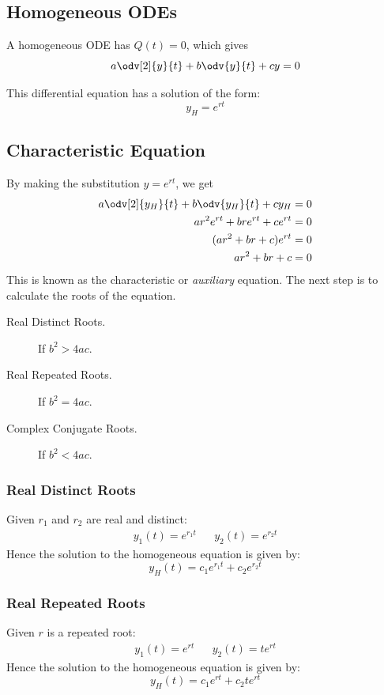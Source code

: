 \documentclass{article}
\begin{document}
\subsection{Homogeneous ODEs}
\begin{definition}
    A homogeneous ODE has \(Q(t)=0\), which gives
    \begin{equation*}
        a \odv[2]{y}{t} + b \odv{y}{t} + c y = 0
    \end{equation*}
\end{definition}
This differential equation has a solution of the form:
\begin{equation*}
    y_H = e^{rt}
\end{equation*}
\subsection{Characteristic Equation}
By making the substitution \(y=e^{rt}\), we get
\begin{align*}
    a \odv[2]{y_H}{t} + b \odv{y_H}{t} + c y_H & = 0 \\
    ar^2e^{rt} + bre^{rt} + ce^{rt}          & = 0 \\
    (ar^2 + br + c)e^{rt}                    & = 0 \\
    ar^2 + br + c                            & = 0
\end{align*}
This is known as the characteristic or \textit{auxiliary} equation. The next step is to calculate the roots of the equation.
\begin{description}
    \item[Real Distinct Roots.] If \(b^2 > 4ac\).
    \item[Real Repeated Roots.] If \(b^2 = 4ac\).
    \item[Complex Conjugate Roots.] If \(b^2 < 4ac\).
\end{description}
\subsubsection{Real Distinct Roots}
Given \(r_1\) and \(r_2\) are real and distinct:
\begin{align*}
    y_1(t) = e^{r_1t} &  & y_2(t) = e^{r_2t}
\end{align*}
Hence the solution to the homogeneous equation is given by:
\begin{equation*}
    y_H(t) = c_1e^{r_1t} + c_2e^{r_2t}
\end{equation*}
\subsubsection{Real Repeated Roots}
Given \(r\) is a repeated root:
\begin{align*}
    y_1(t) = e^{rt} &  & y_2(t) = te^{rt}
\end{align*}
Hence the solution to the homogeneous equation is given by:
\begin{equation*}
    y_H(t) = c_1e^{rt} + c_2te^{rt}
\end{equation*}
\end{document}
